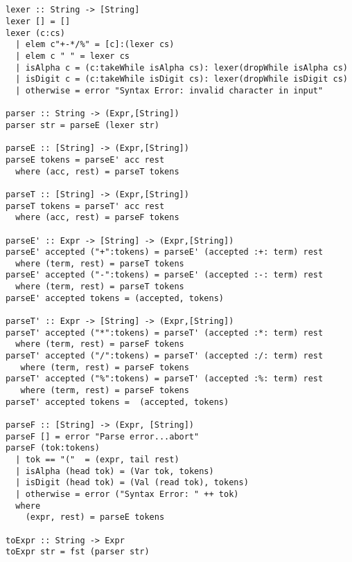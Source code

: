 \documentclass[a4paper,11pt]{article}
\begin{document}
\subsection{}
\begin{lstlisting}
lexer :: String -> [String]
lexer [] = []
lexer (c:cs)
  | elem c"+-*/%" = [c]:(lexer cs)
  | elem c " " = lexer cs
  | isAlpha c = (c:takeWhile isAlpha cs): lexer(dropWhile isAlpha cs)
  | isDigit c = (c:takeWhile isDigit cs): lexer(dropWhile isDigit cs)
  | otherwise = error "Syntax Error: invalid character in input"
  
parser :: String -> (Expr,[String])
parser str = parseE (lexer str)

parseE :: [String] -> (Expr,[String])
parseE tokens = parseE' acc rest
  where (acc, rest) = parseT tokens

parseT :: [String] -> (Expr,[String])
parseT tokens = parseT' acc rest
  where (acc, rest) = parseF tokens 

parseE' :: Expr -> [String] -> (Expr,[String])
parseE' accepted ("+":tokens) = parseE' (accepted :+: term) rest
  where (term, rest) = parseT tokens
parseE' accepted ("-":tokens) = parseE' (accepted :-: term) rest
  where (term, rest) = parseT tokens
parseE' accepted tokens = (accepted, tokens)

parseT' :: Expr -> [String] -> (Expr,[String])
parseT' accepted ("*":tokens) = parseT' (accepted :*: term) rest
  where (term, rest) = parseF tokens
parseT' accepted ("/":tokens) = parseT' (accepted :/: term) rest
   where (term, rest) = parseF tokens
parseT' accepted ("%":tokens) = parseT' (accepted :%: term) rest
   where (term, rest) = parseF tokens
parseT' accepted tokens =  (accepted, tokens)

parseF :: [String] -> (Expr, [String])
parseF [] = error "Parse error...abort"
parseF (tok:tokens)
  | tok == "("  = (expr, tail rest)
  | isAlpha (head tok) = (Var tok, tokens)
  | isDigit (head tok) = (Val (read tok), tokens)
  | otherwise = error ("Syntax Error: " ++ tok)
  where
    (expr, rest) = parseE tokens

toExpr :: String -> Expr
toExpr str = fst (parser str)
\end{lstlisting}
\end{document}

